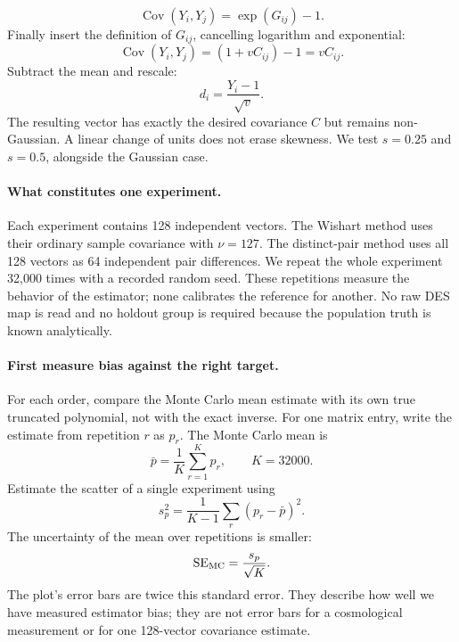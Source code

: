 \documentclass[11pt]{article}
\newcommand{\cov}{\operatorname{Cov}}
\begin{document}
\begin{equation}
 \cov(Y_i,Y_j)=\exp(G_{ij})-1.
\end{equation}
Finally insert the definition of $G_{ij}$, cancelling logarithm and
exponential:
\begin{equation}
 \cov(Y_i,Y_j)=(1+vC_{ij})-1=vC_{ij}.
\end{equation}
Subtract the mean and rescale:
\begin{equation}
 d_i=\frac{Y_i-1}{\sqrt v}.
\end{equation}
The resulting vector has exactly the desired covariance $C$ but remains
non-Gaussian. A linear change of units does not erase skewness. We test
$s=0.25$ and $s=0.5$, alongside the Gaussian case.

\paragraph{What constitutes one experiment.}
Each experiment contains 128 independent vectors. The Wishart method uses
their ordinary sample covariance with $\nu=127$. The distinct-pair method
uses all 128 vectors as 64 independent pair differences. We repeat the whole
experiment 32,000 times with a recorded random seed. These repetitions
measure the behavior of the estimator; none calibrates the reference for
another. No raw DES map is read and no holdout group is required because
the population truth is known analytically.

\paragraph{First measure bias against the right target.}
For each order, compare the Monte Carlo mean estimate with its own true
truncated polynomial, not with the exact inverse. For one matrix entry,
write the estimate from repetition $r$ as $p_r$. The Monte Carlo mean is
\begin{equation}
 \bar p=\frac1K\sum_{r=1}^{K}p_r,\qquad K=32000.
\end{equation}
Estimate the scatter of a single experiment using
\begin{equation}
 s_p^2=\frac1{K-1}\sum_r(p_r-\bar p)^2.
\end{equation}
The uncertainty of the mean over repetitions is smaller:
\begin{equation}
 \operatorname{SE}_{\rm MC}=\frac{s_p}{\sqrt K}.
\end{equation}
The plot's error bars are twice this standard error. They describe how well
we have measured estimator bias; they are not error bars for a cosmological
measurement or for one 128-vector covariance estimate.
\end{document}
